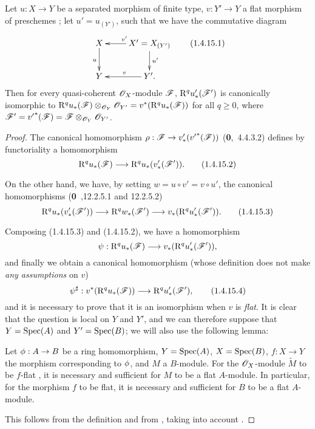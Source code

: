 \begin{proposition}[1.4.15]
\label{3.1.4.15}
Let $u:X\to Y$ be a separated morphism of finite type, $v:Y'\to Y$ a flat morphism of preschemes ; let $u'=u_{(Y')}$, such that we have the commutative diagram
\[
  \xymatrix{
    X\ar[d]_u &
    X'=X_{(Y')}\ar[l]_{v'}\ar[d]^{u'}\\
    Y &
    Y'\ar[l]_{v}.
  }
  \tag{1.4.15.1}
\]
Then for every quasi-coherent $\mathscr{O}_X$-module $\mathscr{F}$, $\mathrm{R}^q u_*'(\mathscr{F}')$ is canonically isomorphic to $\mathrm{R}^q u_*(\mathscr{F})\otimes_{\mathscr{O}_Y}\mathscr{O}_{Y'}=v^*(\mathrm{R}^q u_*(\mathscr{F}))$ for all $q\geq 0$, where $\mathscr{F}'={v'}^*(\mathscr{F})=\mathscr{F}\otimes_{\mathscr{O}_Y}\mathscr{O}_{Y'}$.
\end{proposition}

\begin{proof}
\label{proof-3.1.4.15}
The canonical homomorphism $\rho:\sh{F}\to v_*'({v'}^*(\sh{F}))$ (\textbf{0},~4.4.3.2) defines by functoriality a homomorphism
\[
  \RR^q u_*(\sh{F})\to\RR^q u_*(v_*'(\sh{F}')).
  \tag{1.4.15.2}
\]

On the other hand, we have, by setting $w=u\circ v'=v\circ u'$, the canonical homomorphisms (\textbf{0}~,12.2.5.1 and 12.2.5.2)
\[
  \RR^q u_*(v_*'(\sh{F}'))\to\RR^q w_*(\sh{F}')\to v_*(\RR^q u_*'(\sh{F}')).
  \tag{1.4.15.3}
\]

Composing (1.4.15.3) and (1.4.15.2), we have a homomorphism
\[
  \psi:\RR^q u_*(\sh{F})\to v_*(\RR^q u_*'(\sh{F}')),
\]
and finally we obtain a canonical homomorphism (whose definition does not make \emph{any assumptions} on $v$)
\[
  \psi^\sharp:v^*(\RR^q u_*(\sh{F}))\to\RR^q u_*'(\sh{F}'),
  \tag{1.4.15.4}
\]
and it is necessary to prove that it is an isomorphism when $v$ is \emph{flat}.
It is clear that the question is local on $Y$ and $Y'$, and we can therefore suppose that $Y=\operatorname{Spec}(A)$ and $Y'=\operatorname{Spec}(B)$; we will also use the following lemma:
\begin{lemma}[1.4.15.5]
\label{3.1.4.15.5}
Let $\vphi:A\to B$ be a ring homomorphism, $Y=\operatorname{Spec}(A)$, $X=\operatorname{Spec}(B)$, $f:X\to Y$ the morphism corresponding to $\phi$, and $M$ a $B$-module.
For the $\mathscr{O}_X$-module $\widetilde{M}$ to be $f$-flat , it is necessary and sufficient for $M$ to be a flat $A$-module.
In particular, for the morphism $f$ to be flat, it is necessary and sufficient for $B$ to be a flat $A$-module.
\end{lemma}

This follows from the definition  and from , taking into account .


\end{proof}
